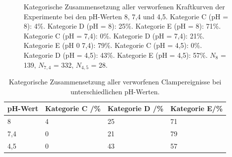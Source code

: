 \begin{figure}[H]
	\centering
	\caption[Kategorische Zusammensetzung aller verworfenen Kraftkurven]{Kategorische Zusammensetzung aller verworfenen Kraftkurven der Experimente bei den pH-Werten 8, 7,4 und 4,5. Kategorie C (pH = 8): 4\%. Kategorie D (pH = 8): 25\%. Kategorie E (pH = 8): 71\%. Kategorie C (pH = 7,4): 0\%. Kategorie D (pH = 7,4): 21\%. Kategorie E (pH 0 7,4): 79\%. Kategorie C (pH = 4,5): 0\%. Kategorie D (pH = 4,5): 43\%. Kategorie E (pH = 4,5): 57\%. $N_8$ = 139, $N_{7,4}$ = 332, $N_{4,5}$ = 28.}
	\label{fig:discarded_curve_composition}
\end{figure}

\begin{table}[H]
	\centering
	\caption[Kategorische Zusammensetzung aller verworfener Clampereignisse]{Kategorische Zusammensetzung aller verworfenen Clampereignisse bei unterschiedlichen pH-Werten.}
	\label{tab:discarded_curve_composition}
	\begin{threeparttable}
		\keepXColumns
		\begin{tabularx}{\textwidth}{X X X X}
			\textbf{pH-Wert}	&	\textbf{Kategorie C /\%}	&	\textbf{Kategorie D /\%}	&	\textbf{Kategorie E/\%}	\\
			\toprule
			\toprule
			8	&	4	&	25	&	71	\\
			7,4	&	0	&	21	&	79	\\
			4,5	&	0	&	43	&	57	\\
			\toprule
			\toprule
		\end{tabularx}
	\end{threeparttable}
\end{table}